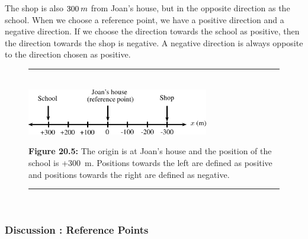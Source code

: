     \addtocounter{footnote}{-0}
    
        \label{m38787*id62778}The shop is also \begin{math}300\phantom{\rule{2pt}{0ex}}m\end{math} from Joan's house, but in the opposite direction as the school. When we choose a reference point, we have a positive direction and a negative direction. If we choose the direction towards the school as positive, then the direction towards the shop is negative. A negative direction is always opposite to the direction chosen as positive.\par 
        
    \setcounter{subfigure}{0}


	\begin{figure}[H] %
    \begin{center}
    \rule[.1in]{\figurerulewidth}{.005in} \\
        \label{m38787*uid8!!!underscore!!!media}\label{m38787*uid8!!!underscore!!!printimage}\includegraphics[width=300px]{col11305.imgs/m38787_PG10C2_004.png} %
        
      \vspace{2pt}
    \vspace{\rubberspace}\par \begin{cnxcaption}
	  \small \textbf{Figure 20.5: }The origin is at Joan's house and the position of the school is +300~m. Positions towards the left are defined as positive and positions towards the right are defined as negative.
	\end{cnxcaption}
      
    \vspace{.1in}
    \rule[.1in]{\figurerulewidth}{.005in} \\
        
    \end{center}

 \end{figure}   

    \addtocounter{footnote}{-0}
    
\label{m38787*secfhsst!!!underscore!!!id127}
            \subsubsection{  Discussion : Reference Points }
            \nopagebreak
            
